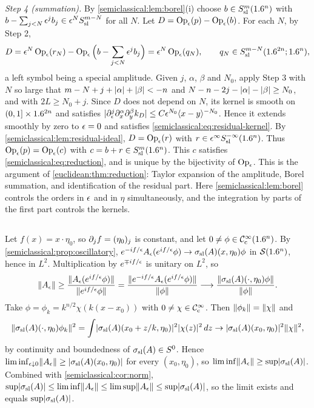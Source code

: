\emph{Step 4 (summation).} By \cref{semiclassical:lem:borel}(i) choose $b\in S^{m}_{\mathrm{sl}}(1.6^n)$ with
$b-\sum_{j<N}\epsilon^jb_j\in\epsilon^NS^{m-N}_{\mathrm{sl}}$ for all $N$. Let $D=\operatorname{Op}_\epsilon(p)-\operatorname{Op}_\epsilon(b)$. For each $N$, by
Step 2,
\begin{equation*}
D=\epsilon^N\operatorname{Op}_\epsilon(r_N)-\operatorname{Op}_\epsilon\Big(b-\sum_{j<N}\epsilon^jb_j\Big)=\epsilon^N\operatorname{Op}_\epsilon(q_N),\qquad q_N\in S^{m-N}_{\mathrm{sl}}(1.6^{2n};1.6^n),
\end{equation*}
a left symbol being a special amplitude. Given $j$, $\alpha$, $\beta$ and $N_0$, apply Step 3 with $N$
so large that $m-N+j+\lvert \alpha\rvert+\lvert \beta\rvert<-n$ and $N-n-2j-\lvert \alpha\rvert-\lvert \beta\rvert\ge N_0$, and with
$2L\ge N_0+j$. Since $D$ does not depend on $N$, its kernel is smooth on $(0,1]\times1.6^{2n}$ and
satisfies $\lvert \partial^j_\epsilon\partial^\alpha_x\partial^\beta_yk_D\rvert\le C\epsilon^{N_0}\langle x-y\rangle^{-N_0}$. Hence it extends
smoothly by zero to $\epsilon=0$ and satisfies \eqref{semiclassical:eq:residual-kernel}. By
\cref{semiclassical:lem:residual-ideal}, $D=\operatorname{Op}_\epsilon(r)$ with $r\in\epsilon^\infty S^{-\infty}_{\mathrm{sl}}(1.6^n)$. Thus
$\operatorname{Op}_\epsilon(p)=\operatorname{Op}_\epsilon(c)$ with $c=b+r\in S^{m}_{\mathrm{sl}}(1.6^n)$. This $c$ satisfies \eqref{semiclassical:eq:reduction},
and is unique by the bijectivity of $\operatorname{Op}_\epsilon$. This is the argument of
\cref{euclidean:thm:reduction}: Taylor expansion of the amplitude, Borel summation, and
identification of the residual part. Here \cref{semiclassical:lem:borel} controls the
orders in $\epsilon$ and in $\eta$ simultaneously, and the integration by parts of the first part
controls the kernels.

\subsection*{}
Let $f(x)=x\cdot\eta_0$, so $\partial_jf=(\eta_0)_j$ is constant, and let $0\ne\phi\in\mathcal{C}^\infty_{\mathrm{c}}(1.6^n)$. By
\cref{semiclassical:prop:oscillatory},
$e^{-if/\epsilon}A_\epsilon(e^{if/\epsilon}\phi)\to\sigma_{\mathrm{sl}}(A)(x,\eta_0)\phi$ in $\mathcal{S}(1.6^n)$, hence in $L^2$. Multiplication by
$e^{\mp if/\epsilon}$ is unitary on $L^2$, so
\begin{equation*}
\lVert A_\epsilon\rVert\ge\frac{\lVert A_\epsilon(e^{if/\epsilon}\phi)\rVert}{\lVert e^{if/\epsilon}\phi\rVert}=\frac{\lVert e^{-if/\epsilon}A_\epsilon(e^{if/\epsilon}\phi)\rVert}{\lVert \phi\rVert}
\longrightarrow\frac{\lVert \sigma_{\mathrm{sl}}(A)(\cdot,\eta_0)\phi\rVert}{\lVert \phi\rVert}.
\end{equation*}
Take $\phi=\phi_k=k^{n/2}\chi(k(x-x_0))$ with $0\ne\chi\in\mathcal{C}^\infty_{\mathrm{c}}$. Then $\lVert \phi_k\rVert=\lVert \chi\rVert$ and
\begin{equation*}
\lVert \sigma_{\mathrm{sl}}(A)(\cdot,\eta_0)\phi_k\rVert^2=\int\lvert \sigma_{\mathrm{sl}}(A)(x_0+z/k,\eta_0)\rvert^2\lvert \chi(z)\rvert^2\,dz\to\lvert \sigma_{\mathrm{sl}}(A)(x_0,\eta_0)\rvert^2\lVert \chi\rVert^2,
\end{equation*}
by continuity and boundedness of $\sigma_{\mathrm{sl}}(A)\in S^0$. Hence
$\liminf_{\epsilon\downarrow0}\lVert A_\epsilon\rVert\ge\lvert \sigma_{\mathrm{sl}}(A)(x_0,\eta_0)\rvert$ for every $(x_0,\eta_0)$, so
$\liminf\lVert A_\epsilon\rVert\ge\sup\lvert \sigma_{\mathrm{sl}}(A)\rvert$. Combined with \cref{semiclassical:cor:norm},
$\sup\lvert \sigma_{\mathrm{sl}}(A)\rvert\le\liminf\lVert A_\epsilon\rVert\le\limsup\lVert A_\epsilon\rVert\le\sup\lvert \sigma_{\mathrm{sl}}(A)\rvert$, so the limit exists and
equals $\sup\lvert \sigma_{\mathrm{sl}}(A)\rvert$.

